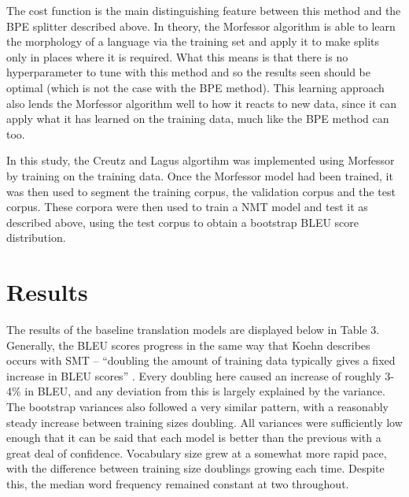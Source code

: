 \documentclass[11pt]{article}
\begin{document}
\bigskip

The cost function is the main distinguishing feature between this method and the BPE splitter described above. In theory, the Morfessor algorithm is able to learn the morphology of a language via the training set and apply it to make splits only in places where it is required. What this means is that there is no hyperparameter to tune with this method and so the results seen should be optimal (which is not the case with the BPE method). This learning approach also lends the Morfessor algorithm well to how it reacts to new data, since it can apply what it has learned on the training data, much like the BPE method can too. 

\bigskip

In this study, the Creutz and Lagus algortihm was implemented using Morfessor by training on the training data. Once the Morfessor model had been trained, it was then used to segment the training corpus, the validation corpus and the test corpus. These corpora were then used to train a NMT model and test it as described above, using the test corpus to obtain a bootstrap BLEU score distribution.

\newpage

\section{Results}

The results of the baseline translation models are displayed below in Table 3. Generally, the BLEU scores progress in the same way that Koehn describes occurs with SMT -- ``doubling the amount of training data typically gives a fixed increase in BLEU scores'' \citep[p. 295]{koehn2020}. Every doubling here caused an increase of roughly 3-4\% in BLEU, and any deviation from this is largely explained by the variance. The bootstrap variances also followed a very similar pattern, with a reasonably steady increase between training sizes doubling. All variances were sufficiently low enough that it can be said that each model is better than the previous with a great deal of confidence. Vocabulary size grew at a somewhat more rapid pace, with the difference between training size doublings growing each time. Despite this, the median word frequency remained constant at two throughout.
\end{document}

